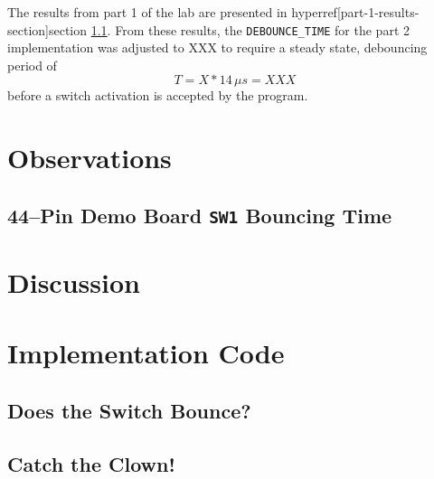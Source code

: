 \documentclass[11pt]{article}
\begin{document}
The results from part 1 of the lab are presented in
hyperref[part-1-results-section]{section \ref{part-1-results-section}}.
From these results, the \texttt{DEBOUNCE\_TIME} for the part 2 implementation
was adjusted to XXX to require a steady state, debouncing period of
\begin{equation*}
T=X*14\, \mu s=XXX
\end{equation*}
before a switch activation is accepted by the program.

\section{Observations}

\subsection{44--Pin Demo Board \texttt{SW1} Bouncing Time}
\label{part-1-results-section}

\section{Discussion}

\clearpage

\section{Implementation Code}

\subsection{Does the Switch Bounce?}
\label{debounce-time-code}


\clearpage
\subsection{Catch the Clown!}
\label{catch-the-clown-code}

\end{document}
